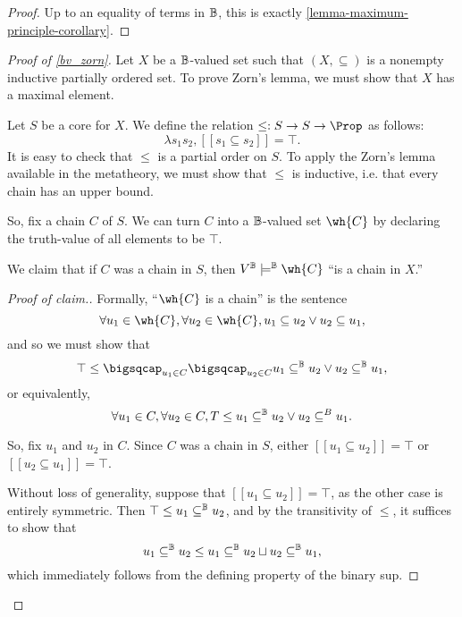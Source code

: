 \documentclass[11pt]{article}
\begin{document}

\begin{proof}
  Up to an equality of terms in $\mathbb{B}$, this is exactly \ref{lemma-maximum-principle-corollary}.
\end{proof}

\begin{proof}[Proof of \ref{bv_zorn}]
  Let $X$ be a $\mathbb{B}$-valued set such that $(X, \subseteq)$ is a nonempty inductive partially ordered set. To prove Zorn's lemma, we must show that $X$ has a maximal element.

  Let $S$ be a core for $X$. We define the relation $\leq : S \to S \to \Prop$ as follows:
  $$
\lambda s_1 s_2, [[s_1 \subseteq s_2]] = \top.
$$
It is easy to check that $\leq$ is a partial order on $S$. To apply the Zorn's lemma available in the metatheory, we must show that $\leq$ is inductive, i.e. that every chain has an upper bound.

So, fix a chain $C$ of $S$. We can turn $C$ into a $\mathbb{B}$-valued set $\wh{C}$ by declaring the truth-value of all elements to be $\top$.

We claim that if $C$ was a chain in $S$, then $V^\B \models^\B \wh{C}$ ``is a chain in $X$.''
\begin{proof}[Proof of claim.]
  Formally, ``$\wh{C}$ is a chain'' is the sentence
  $$
\forall u_1 \in \wh{C}, \forall u_2 \in \wh{C}, u_1 \subseteq u_2 \lor u_2 \subseteq u_1,
$$
and so we must show that
$$
\top \leq \bigsqcap_{u_1 \in C} \bigsqcap_{u_2 \in C} u_1 \subseteq^\B u_2 \lor u_2 \subseteq^\B u_1,
$$
or equivalently,
$$
\forall u_1 \in C, \forall u_2 \in C, T \leq u_1 \subseteq^{\mathbb{B}} u_2 \lor u_2 \subseteq^B u_1.
$$

So, fix $u_1$ and $u_2$ in $C$. Since $C$ was a chain in $S$, either $[[u_1 \subseteq u_2]] = \top$ or $[[u_2 \subseteq u_1]] = \top$. 

Without loss of generality, suppose that $[[u_1 \subseteq u_2]] = \top$, as the other case is entirely symmetric. Then $\top \leq u_1 \subseteq^{\mathbb{B}} u_2$, and by the transitivity of $\leq$, it suffices to show that
$$
u_1 \subseteq^{\mathbb{B}} u_2 \leq u_1 \subseteq^{\mathbb{B}} u_2 \sqcup u_2 \subseteq^{\mathbb{B}} u_1,
$$
which immediately follows from the defining property of the binary sup.


\end{proof}
\end{proof}
\end{document}
